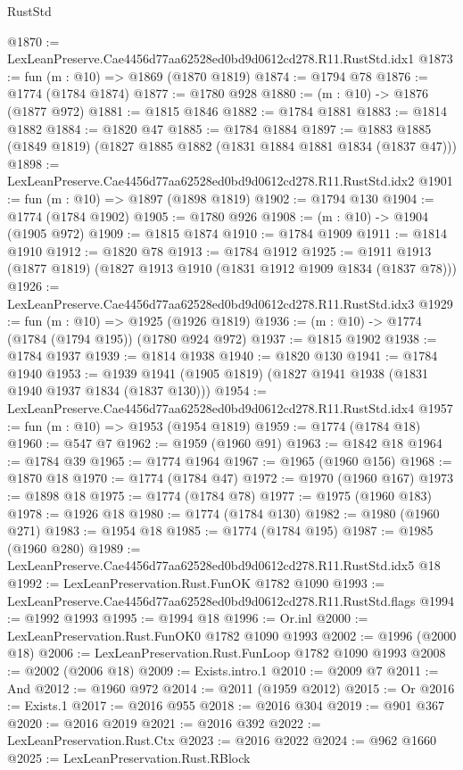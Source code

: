 \begin{lexlean}{RustStd}
\begin{coremodule}
@1870 := LexLeanPreserve.Cae4456d77aa62528ed0bd9d0612cd278.R11.RustStd.idx1
@1873 := fun (m : @10) => @1869 (@1870 @1819)
@1874 := @1794 @78
@1876 := @1774 (@1784 @1874)
@1877 := @1780 @928
@1880 := (m : @10) -> @1876 (@1877 @972)
@1881 := @1815 @1846
@1882 := @1784 @1881
@1883 := @1814 @1882
@1884 := @1820 @47
@1885 := @1784 @1884
@1897 := @1883 @1885 (@1849 @1819) (@1827 @1885 @1882 (@1831 @1884 @1881 @1834 (@1837 @47)))
@1898 := LexLeanPreserve.Cae4456d77aa62528ed0bd9d0612cd278.R11.RustStd.idx2
@1901 := fun (m : @10) => @1897 (@1898 @1819)
@1902 := @1794 @130
@1904 := @1774 (@1784 @1902)
@1905 := @1780 @926
@1908 := (m : @10) -> @1904 (@1905 @972)
@1909 := @1815 @1874
@1910 := @1784 @1909
@1911 := @1814 @1910
@1912 := @1820 @78
@1913 := @1784 @1912
@1925 := @1911 @1913 (@1877 @1819) (@1827 @1913 @1910 (@1831 @1912 @1909 @1834 (@1837 @78)))
@1926 := LexLeanPreserve.Cae4456d77aa62528ed0bd9d0612cd278.R11.RustStd.idx3
@1929 := fun (m : @10) => @1925 (@1926 @1819)
@1936 := (m : @10) -> @1774 (@1784 (@1794 @195)) (@1780 @924 @972)
@1937 := @1815 @1902
@1938 := @1784 @1937
@1939 := @1814 @1938
@1940 := @1820 @130
@1941 := @1784 @1940
@1953 := @1939 @1941 (@1905 @1819) (@1827 @1941 @1938 (@1831 @1940 @1937 @1834 (@1837 @130)))
@1954 := LexLeanPreserve.Cae4456d77aa62528ed0bd9d0612cd278.R11.RustStd.idx4
@1957 := fun (m : @10) => @1953 (@1954 @1819)
@1959 := @1774 (@1784 @18)
@1960 := @547 @7
@1962 := @1959 (@1960 @91)
@1963 := @1842 @18
@1964 := @1784 @39
@1965 := @1774 @1964
@1967 := @1965 (@1960 @156)
@1968 := @1870 @18
@1970 := @1774 (@1784 @47)
@1972 := @1970 (@1960 @167)
@1973 := @1898 @18
@1975 := @1774 (@1784 @78)
@1977 := @1975 (@1960 @183)
@1978 := @1926 @18
@1980 := @1774 (@1784 @130)
@1982 := @1980 (@1960 @271)
@1983 := @1954 @18
@1985 := @1774 (@1784 @195)
@1987 := @1985 (@1960 @280)
@1989 := LexLeanPreserve.Cae4456d77aa62528ed0bd9d0612cd278.R11.RustStd.idx5 @18
@1992 := LexLeanPreservation.Rust.FunOK @1782 @1090
@1993 := LexLeanPreserve.Cae4456d77aa62528ed0bd9d0612cd278.R11.RustStd.flags
@1994 := @1992 @1993
@1995 := @1994 @18
@1996 := Or.inl
@2000 := LexLeanPreservation.Rust.FunOK0 @1782 @1090 @1993
@2002 := @1996 (@2000 @18)
@2006 := LexLeanPreservation.Rust.FunLoop @1782 @1090 @1993
@2008 := @2002 (@2006 @18)
@2009 := Exists.intro.{1}
@2010 := @2009 @7
@2011 := And
@2012 := @1960 @972
@2014 := @2011 (@1959 @2012)
@2015 := Or
@2016 := Exists.{1}
@2017 := @2016 @955
@2018 := @2016 @304
@2019 := @901 @367
@2020 := @2016 @2019
@2021 := @2016 @392
@2022 := LexLeanPreservation.Rust.Ctx
@2023 := @2016 @2022
@2024 := @962 @1660
@2025 := LexLeanPreservation.Rust.RBlock

\end{coremodule}
\end{lexlean}
